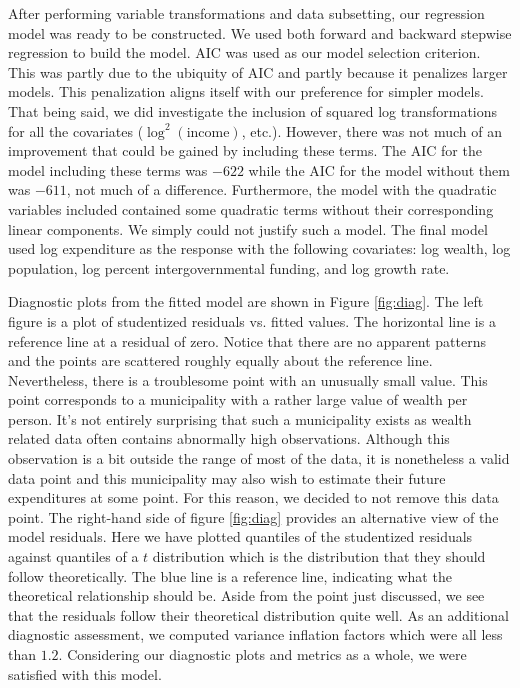 \documentclass{article}\usepackage[]{graphicx}\usepackage[]{color}
\begin{document}
After performing variable transformations and data subsetting, our regression model was ready to be constructed. We used both forward and backward stepwise regression to build the model. AIC was used as our model selection criterion. This was partly due to the ubiquity of AIC and partly because it penalizes larger models. This penalization aligns itself with our preference for simpler models. That being said, we did investigate the inclusion of squared log transformations for all the covariates ($\log^2(\text{income})$, etc.). However, there was not much of an improvement that could be gained by including these terms. The AIC for the model including these terms was $-622$ while the AIC for the model without them was $-611$, not much of a difference. Furthermore, the model with the quadratic variables included contained some quadratic terms without their corresponding linear components. We simply could not justify such a model. The final model used log expenditure as the response with the following covariates: log wealth, log population, log percent intergovernmental funding, and log growth rate.

Diagnostic plots from the fitted model are shown in Figure \ref{fig:diag}. The left figure is a plot of studentized residuals vs. fitted values. The horizontal line is a reference line at a residual of zero. Notice that there are no apparent patterns and the points are scattered roughly equally about the reference line. Nevertheless, there is a troublesome point with an unusually small value. This point corresponds to a municipality with a rather large value of wealth per person. It's not entirely surprising that such a municipality exists as wealth related data often contains abnormally high observations. Although this observation is a bit outside the range of most of the data, it is nonetheless a valid data point and this municipality may also wish to estimate their future expenditures at some point. For this reason, we decided to not remove this data point. The right-hand side of figure \ref{fig:diag} provides an alternative view of the model residuals. Here we have plotted quantiles of the studentized residuals against quantiles of a $t$ distribution which is the distribution that they should follow theoretically. The blue line is a reference line, indicating what the theoretical relationship should be. Aside from the point just discussed, we see that the residuals follow their theoretical distribution quite well. As an additional diagnostic assessment, we computed variance inflation factors which were all less than $1.2$. Considering our diagnostic plots and metrics as a whole, we were satisfied with this model.
\end{document}

